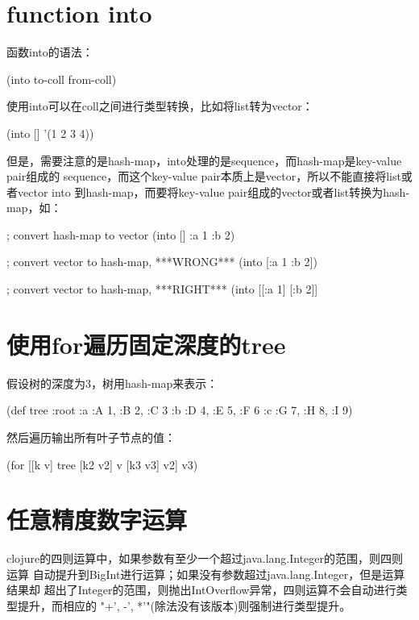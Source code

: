 ﻿\documentclass[a4paper,11pt]{article}
\begin{document}
  \section[function into]{function into}
  函数into的语法：\par
  \begin{schemecode}
    (into to-coll from-coll)
  \end{schemecode}

  使用into可以在coll之间进行类型转换，比如将list转为vector：\par
  \begin{schemecode}
    (into [] '(1 2 3 4))
  \end{schemecode}

  但是，需要注意的是hash-map，into处理的是sequence，而hash-map是key-value pair组成的
  sequence，而这个key-value pair本质上是vector，所以不能直接将list或者vector into
  到hash-map，而要将key-value pair组成的vector或者list转换为hash-map，如：\par
  \begin{schemecode}
    ; convert hash-map to vector
    (into [] {:a 1 :b 2})
    
    ; convert vector to hash-map, ***WRONG***
    (into {} [:a 1 :b 2])

    ; convert vector to hash-map, ***RIGHT***
    (into {} [[:a 1] [:b 2]]
  \end{schemecode}

  \section[使用for遍历固定深度的tree]{使用for遍历固定深度的tree}
  假设树的深度为3，树用hash-map来表示：\par
  \begin{schemecode}
    (def tree
      {:root
        {:a
          {:A 1, :B 2, :C 3}
         :b
          {:D 4, :E 5, :F 6}
         :c
          {:G 7, :H 8, :I 9}}})
  \end{schemecode}

  然后遍历输出所有叶子节点的值：\par
  \begin{schemecode}
    (for [[k v] tree
          [k2 v2] v
          [k3 v3] v2]
      v3)    
  \end{schemecode}

  \section[任意精度数字运算]{任意精度数字运算}
  clojure的四则运算中，如果参数有至少一个超过java.lang.Integer的范围，则四则运算
  自动提升到BigInt进行运算；如果没有参数超过java.lang.Integer，但是运算结果却
  超出了Integer的范围，则抛出IntOverflow异常，四则运算不会自动进行类型提升，而相应的
  "+', -', *'"(除法没有该版本)则强制进行类型提升。
\end{document}
